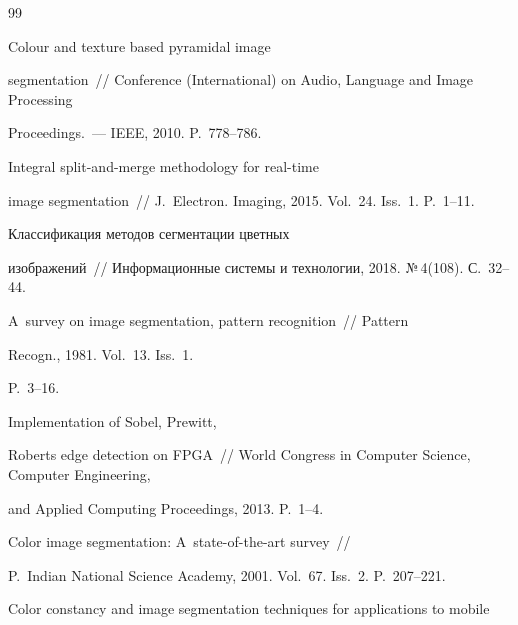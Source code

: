 {\small\frenchspacing

{%


\begin{thebibliography}{99}

  


 Colour and texture based pyramidal image 

segmentation~/\!\!/  Conference (International) on Audio, Language and Image Processing 

Proceedings.~--- IEEE, 2010. P.~778--786.


 Integral split-and-merge methodology for real-time 

image segmentation~/\!\!/ J.~Electron. Imaging, 2015. Vol.~24. Iss.~1. P.~1--11.


 Классификация методов сегментации цветных 

изоб\-ра\-же\-ний~/\!\!/ Информационные системы и технологии, 2018. №\,4(108). С.~32--44.


 A~survey on image segmentation, pattern recognition~/\!\!/ Pattern 

Recogn., 1981. Vol.~13. Iss.~1.  

P.~3--16.


 Implementation of Sobel, Prewitt, 

Roberts edge detection on FPGA~/\!\!/ World Congress in Computer Science, Computer Engineering, 

and Applied Computing Proceedings, 2013. P.~1--4.


 Color image segmentation: A~state-of-the-art survey~/\!\!/ 

P.~Indian National Science Academy, 2001. Vol.~67. Iss.~2. P.~207--221.


 Color constancy and image segmentation techniques for applications to mobile 


\end{thebibliography}}}
